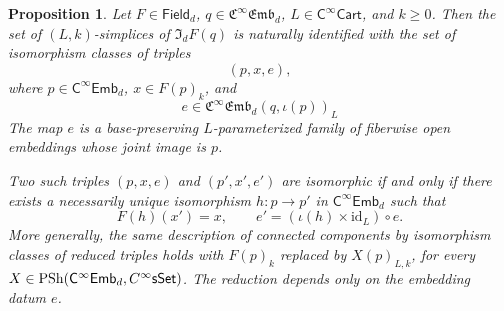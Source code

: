 \documentclass[10pt,a4paper]{amsart}
\newtheorem{proposition}{Proposition}
\newcommand{\Cart}{\cat{C}^{\infty}\cat{Cart}}
\newcommand{\CsSet}{\textnormal{C}^{\infty}\sset}
\newcommand{\cat}[1]{\mathsf{#1}}
\newcommand{\femb}[1]{\mathfrak{C}^{\infty}\mathfrak{Emb}_{#1}}
\newcommand{\fembnoniso}[1]{\cat{C}^{\infty}\cat{Emb}_{#1}}
\newcommand{\fieldnoniso}[1]{\cat{Field}_{#1}}
\newcommand{\id}{\mathrm{id}}
\newcommand{\psh}{\mathrm{PSh}}
\newcommand{\sset}{\cat{sSet}}
\begin{document}
\begin{proposition}\label{prop:reduced.category.discrete}
  Let \(F\in \fieldnoniso{d}\), \(q\in \femb{d}\),
  \(L\in \Cart\), and \(k\geq 0\). Then the set of
  \((L,k)\)-simplices of \(\mathfrak{I}_{d}F(q)\) is naturally identified
  with the set of isomorphism classes of triples
  \[
    (p,x,e),
  \]
  where \(p\in \fembnoniso{d}\), \(x\in F(p)_k\), and
  \[
    e\in \femb{d}(q,\iota(p))_L
  \]
  The map \(e\) is a base-preserving \(L\)-parameterized family of
  fiberwise open embeddings whose joint image is \(p\).

  Two such triples \((p,x,e)\) and \((p',x',e')\) are isomorphic if and only
  if there exists a necessarily unique isomorphism \(h:p\to p'\) in
  \(\fembnoniso{d}\) such that
  \[
    F(h)(x')=x,
    \qquad
    e'=(\iota(h)\times \id_L)\circ e.
  \]
  More generally, the same description of connected components by
  isomorphism classes of reduced triples holds with \(F(p)_k\) replaced by
  \(X(p)_{L,k}\), for every
  \(X\in\psh(\fembnoniso{d},\CsSet)\). The reduction depends only on the
  embedding datum \(e\).
\end{proposition}
\end{document}
